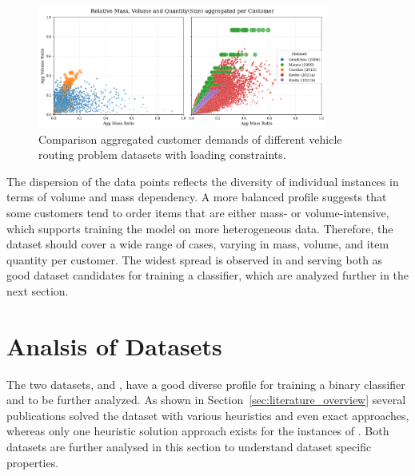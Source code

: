 \begin{figure}[ht]
	\centering
	\includegraphics[width=0.85\textwidth]{pictures/comparison_datasets_3lcvrp.png}
	\caption{Comparison aggregated customer demands of different vehicle routing problem datasets with loading constraints.}
	\label{fig:dataset_comparison}
\end{figure}

The dispersion of the data points reflects the diversity of individual instances in terms of volume
and mass dependency. A more balanced profile suggests that some customers tend to order items that
are either mass- or volume-intensive, which supports training the model on more heterogeneous data.
Therefore, the dataset should cover a wide range of cases, varying in mass, volume, and item
quantity per customer. The widest spread is observed in \krebsADataSetText and \gendreauDataSetText serving
both as good dataset candidates for training a classifier, which are analyzed further in
the next section.

\section{Analsis of Datasets}
\label{sec:analysis_datasets}

The two datasets, \krebsADataSetText and \gendreauDataSet, have a good diverse profile for training
a binary classifier and to be further analyzed.
As shown in Section~\ref{sec:literature_overview} several publications solved the \gendreauDataSetText dataset
with various heuristics and even exact approaches, whereas only one heuristic solution approach exists for the instances of \krebsADataSet.
Both datasets are further analysed in this section to understand dataset specific properties.

\subsubsection{\krebsADataSetText}

